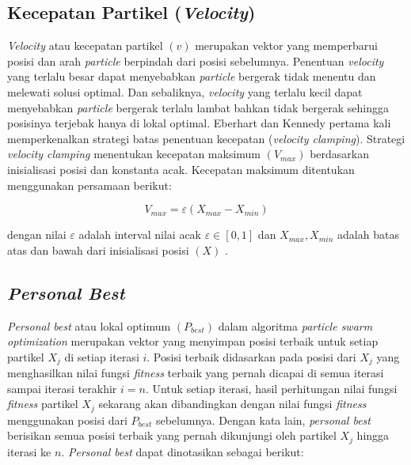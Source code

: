 {\subsection{Kecepatan Partikel (\textit{Velocity})}
{\frenchspacing
\textit{Velocity} atau kecepatan partikel $(v)$ merupakan vektor yang memperbarui posisi dan arah \textit{particle} berpindah dari posisi sebelumnya.
Penentuan \textit{velocity} yang terlalu besar dapat menyebabkan \textit{particle} bergerak tidak menentu dan melewati solusi optimal.
Dan sebaliknya, \textit{velocity} yang terlalu kecil dapat menyebabkan \textit{particle} bergerak terlalu lambat bahkan tidak bergerak sehingga
posisinya terjebak hanya di lokal optimal. Eberhart dan Kennedy pertama kali memperkenalkan strategi batas penentuan kecepatan (\textit{velocity clamping}).
Strategi \textit{velocity clamping} menentukan kecepatan maksimum $(V_{max})$ berdasarkan inisialisasi posisi dan konstanta acak.
Kecepatan maksimum ditentukan menggunakan persamaan berikut:

\begin{equation}
    V_{max} = \varepsilon (X_{max}-X_{min})
    \label{pers: velocity clamping}
\end{equation}

\hspace{-0.675cm}dengan nilai $\varepsilon$ adalah interval nilai acak $\varepsilon \in [0,1]$ dan $X_{max},X_{min}$ adalah batas atas dan bawah dari inisialisasi posisi $(X)$ .
}

\vspace{-5mm}
\subsection{\textit{Personal Best}}
{\frenchspacing
    \textit{Personal best} atau lokal optimum $(P_{best})$ dalam algoritma \textit{particle swarm optimization} merupakan vektor yang menyimpan posisi terbaik untuk setiap partikel $X_{j}$ di setiap iterasi $i$.
    Posisi terbaik didasarkan pada posisi dari $X_{j}$ yang menghasilkan nilai fungsi \textit{fitness} terbaik yang pernah dicapai di semua iterasi sampai iterasi terakhir $i=n$.
    Untuk setiap iterasi, hasil perhitungan nilai fungsi \textit{fitness} partikel $X_{j}$ sekarang akan dibandingkan dengan nilai fungsi \textit{fitness} menggunakan posisi dari $P_{best}$ sebelumnya.
    Dengan kata lain, \textit{personal best} berisikan semua posisi terbaik yang pernah dikunjungi oleh partikel $X_{j}$ hingga iterasi ke $n$.
    \textit{Personal best} dapat dinotasikan sebagai berikut:

}}
